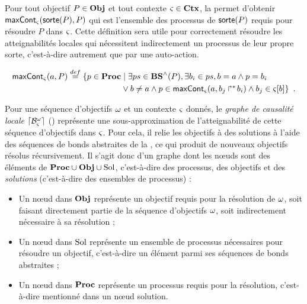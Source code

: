 Pour tout objectif $P \in \mathbf{Obj}$ et tout contexte $\varsigma \in \mathbf{Ctx}$, la 
permet d'obtenir $\mathsf{maxCont}_\varsigma(\mathsf{sorte}(P), P)$
qui est l'ensemble des processus de $\mathsf{sorte}(P)$ requis pour résoudre $P$ dans $\varsigma$.
Cette définition sera utile pour correctement résoudre les atteignabilités locales
qui nécessitent indirectement un processus de leur propre sorte,
c'est-à-dire autrement que par une auto-action.

\begin{definition}[$\gCont_\ctx : \Sigma \times \Obj \to \powerset(\PHproc)$]
  \begin{align*}
    \mathsf{maxCont}_\varsigma(a,P) \stackrel{def}=
    \{ p \in \mathbf{Proc} &\mid \exists ps \in \mathbf{BS}^\wedge(P), \exists b_i \in ps, b = a \wedge p = b_i \\
      & \vee b \neq a \wedge p \in \mathsf{maxCont}_\varsigma(a, \mbox{$b_j\Rsh^*\!b_i$}) \wedge b_j \in {\varsigma[b]} \}
    \enspace.
  \end{align*}
\end{definition}

Pour une séquence d'objectifs $\omega$ et un contexte $\varsigma$ donnés,
le \emph{graphe de causalité locale} $\lceil \mathcal{B}_\varsigma^\omega\rceil$ () représente une sous-approximation de
l'atteignabilité de cette séquence d'objectifs dans $\varsigma$.
Pour cela, il relie les objectifs à des solutions à
l'aide des séquences de bonds abstraites de la , ce qui produit de nouveaux objectifs
résolus récursivement.
Il s'agit donc d'un graphe dont les nœuds sont des éléments de $\mathbf{Proc} \cup \mathbf{Obj} \cup \mathrm{Sol}$,
c'est-à-dire des processus, des objectifs et des \emph{solutions}
(c'est-à-dire des ensembles de processus) :
\begin{itemize}
  \item Un nœud dans $\mathbf{Obj}$ représente un objectif requis pour la résolution de $\omega$,
    soit faisant directement partie de la séquence d'objectifs $\omega$,
    soit indirectement nécessaire à sa résolution ;
  \item Un nœud dans $\mathrm{Sol}$ représente un ensemble de processus nécessaires pour résoudre
    un objectif, c'est-à-dire un élément parmi ses séquences de bonds abstraites ;
  \item Un nœud dans $\mathbf{Proc}$ représente un processus requis pour la résolution,
    c'est-à-dire mentionné dans un nœud solution.
\end{itemize}

